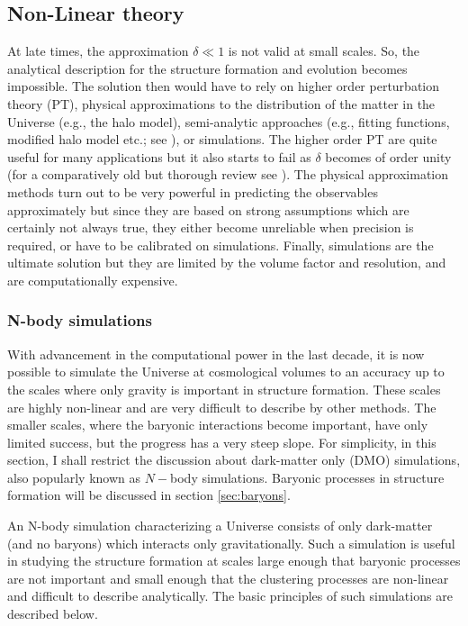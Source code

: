 \documentclass[
  11pt,
  twoside,
  openright,
  titlepage,
  headings=optiontoheadandtoc
]{scrbook}
\begin{document}
\subsection{Non-Linear theory}

At late times, the approximation $\delta \ll 1$ is not valid at small scales. So, the analytical
description for the structure formation and evolution becomes impossible. 
The solution then would have to rely on higher order perturbation theory (PT), 
physical approximations to the
distribution of the matter in the Universe (e.g., the halo model), 
semi-analytic approaches (e.g., fitting functions, modified halo model etc.;
see \cite{Takahashi:2012em,Smith:2002dz}), or simulations. 
The higher order PT are quite useful for many applications but it also starts to 
fail as $\delta$ becomes of order unity (for a comparatively old
but thorough review see \cite{1994FCPh...15..209D}). The physical approximation methods turn 
out to be very powerful in predicting the observables approximately 
but since they are based on strong assumptions which are 
certainly not always true, they either become unreliable when precision is required, or have
to be calibrated on simulations. Finally, simulations are the ultimate solution but they
are limited by the volume factor and resolution, and are computationally expensive. 


\subsubsection{N-body simulations}

With advancement in the computational power in the last decade, it is now possible to
simulate the Universe at cosmological volumes to an accuracy up to the scales where
only gravity is important in structure formation. These scales are highly non-linear and are
very difficult to describe by other methods. The smaller scales, where the baryonic
interactions become important, have only limited success, but the progress has a very
steep slope. For simplicity, in this section, I shall restrict 
the discussion about dark-matter only (DMO)
simulations, also popularly known as $N-$body simulations. 
Baryonic processes in structure formation will be 
discussed in section \ref{sec:baryons}.

An N-body simulation
characterizing a Universe consists of only dark-matter (and no baryons) which
interacts only gravitationally. Such a simulation is useful in studying the
structure formation at scales large enough that baryonic processes are not 
important and small enough that the clustering processes are non-linear and difficult
to describe analytically. The basic principles of such simulations are described below.
\end{document}
